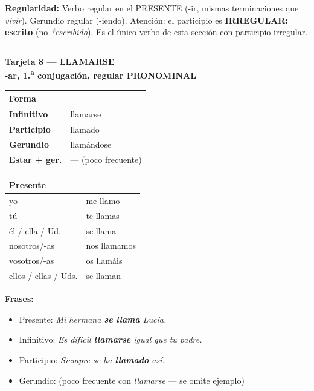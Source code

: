 \documentclass[a4paper,10pt]{article}
\newcommand{\verboheader}[3]{%
  \noindent
  \colorbox{azulverbo!90}{\parbox{\dimexpr\linewidth-2\fboxsep}{%
    \centering\color{white}\bfseries\large Tarjeta #1 --- #2\\[2pt]
    \normalsize #3%
  }}
  \vspace{4pt}
}
\newcommand{\tarjetasep}{%
  \vspace{6pt}
  \noindent\rule{\linewidth}{0.4pt}
  \vspace{6pt}
}
\begin{document}
\begin{trucoverbo}
\textbf{Regularidad:} Verbo regular en el PRESENTE (-ir, mismas terminaciones que \textit{vivir}). Gerundio regular (-iendo). Atención: el participio es \textcolor{rojoirr}{\textbf{IRREGULAR: escrito}} (no \textit{*escribido}). Es el único verbo de esta sección con participio irregular.
\end{trucoverbo}

\tarjetasep

\verboheader{8}{LLAMARSE}{-ar, 1.\textsuperscript{a} conjugación, regular PRONOMINAL}

\begin{minipage}[t]{0.48\linewidth}
\small
\begin{tabular}{|>{\bfseries}l|l|}
\hline
\rowcolor{azulverbo!15} Forma & \\
\hline
Infinitivo & llamarse \\
\hline
\rowcolor{grisclaro}
Participio & llamado \\
\hline
Gerundio & llamándose \\
\hline
\rowcolor{grisclaro}
Estar + ger. & --- (poco frecuente) \\
\hline
\end{tabular}
\end{minipage}
\hfill
\begin{minipage}[t]{0.48\linewidth}
\small
\begin{tabular}{|l|l|}
\hline
\rowcolor{azulverbo!15} \textbf{Presente} & \\
\hline
yo & me llamo \\
\hline
\rowcolor{grisclaro}
tú & te llamas \\
\hline
él / ella / Ud. & se llama \\
\hline
\rowcolor{grisclaro}
nosotros/-as & nos llamamos \\
\hline
vosotros/-as & os llamáis \\
\hline
\rowcolor{grisclaro}
ellos / ellas / Uds. & se llaman \\
\hline
\end{tabular}
\end{minipage}

\vspace{4pt}
\small
\textbf{Frases:}
\begin{itemize}[nosep, leftmargin=1em]
\item Presente: \textit{Mi hermana \textbf{se llama} Lucía.}
\item Infinitivo: \textit{Es difícil \textbf{llamarse} igual que tu padre.}
\item Participio: \textit{Siempre se ha \textbf{llamado} así.}
\item Gerundio: (poco frecuente con \textit{llamarse} --- se omite ejemplo)
\end{itemize}
\end{document}
